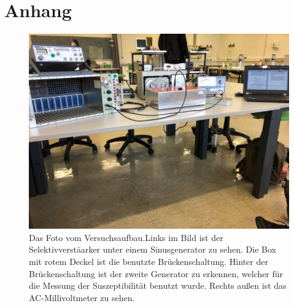 \section{Anhang}
\label{sec:Anhang}
\begin{figure}
    \centering
    \includegraphics[width=\textwidth]{content/index.pdf}
    \caption{Das Foto vom Versuchsaufbau.Links im Bild ist der Selektivverstäarker unter einem Sinusgenerator zu sehen. 
    Die Box mit rotem Deckel ist die benutzte Brückenschaltung. 
    Hinter der Brückenschaltung ist der zweite Generator zu erkennen, welcher für die Messung der Suszeptibilität benutzt wurde.
    Rechts außen ist das AC-Millivoltmeter zu sehen.}
    \label{fig:datenselektiv1}
\end{figure}
